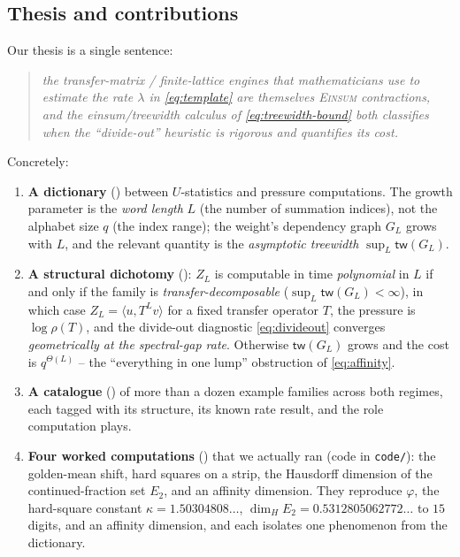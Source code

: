 \documentclass[11pt]{article}
\newcommand{\Einsum}{\textsc{Einsum}}
\newcommand{\tw}{\mathsf{tw}}
\newcommand{\treewidthp}[1]{\tw(#1)}
\theoremstyle{plain}
\theoremstyle{definition}
\theoremstyle{remark}
\begin{document}
\subsection{Thesis and contributions}

Our thesis is a single sentence:
\begin{quote}\itshape
the transfer-matrix / finite-lattice engines that mathematicians use to estimate
the rate $\lambda$ in \eqref{eq:template} are themselves \Einsum{} contractions,
and the einsum/treewidth calculus of \eqref{eq:treewidth-bound} both classifies
when the ``divide-out'' heuristic is rigorous and quantifies its cost.
\end{quote}
Concretely:
\begin{enumerate}[leftmargin=2.2em,itemsep=2pt]
\item \textbf{A dictionary} () between $U$-statistics and
pressure computations. The growth parameter is the \emph{word length} $L$ (the
number of summation indices), not the alphabet size $q$ (the index range); the
weight's dependency graph $G_L$ grows with $L$, and the relevant quantity is the
\emph{asymptotic treewidth} $\sup_L\treewidthp{G_L}$.

\item \textbf{A structural dichotomy} ():
$Z_L$ is computable in time \emph{polynomial} in $L$ if and only if the family is
\emph{transfer-decomposable} ($\sup_L\treewidthp{G_L}<\infty$), in which case
$Z_L=\langle u,T^Lv\rangle$ for a fixed transfer operator $T$, the pressure is
$\log\rho(T)$, and the divide-out diagnostic \eqref{eq:divideout} converges
\emph{geometrically at the spectral-gap rate}. Otherwise $\treewidthp{G_L}$ grows
and the cost is $q^{\Theta(L)}$ -- the ``everything in one lump'' obstruction of
\eqref{eq:affinity}.

\item \textbf{A catalogue} () of more than a dozen example
families across both regimes, each tagged with its structure, its known rate
result, and the role computation plays.

\item \textbf{Four worked computations} () that we actually
ran (code in \texttt{code/}): the golden-mean shift, hard squares on a strip, the
Hausdorff dimension of the continued-fraction set $E_2$, and an affinity dimension.
They reproduce $\varphi$, the hard-square constant $\kappa=1.50304808\ldots$,
$\dim_H E_2=0.5312805062772\ldots$ to $15$ digits, and an affinity dimension, and
each isolates one phenomenon from the dictionary.
\end{enumerate}
\end{document}
